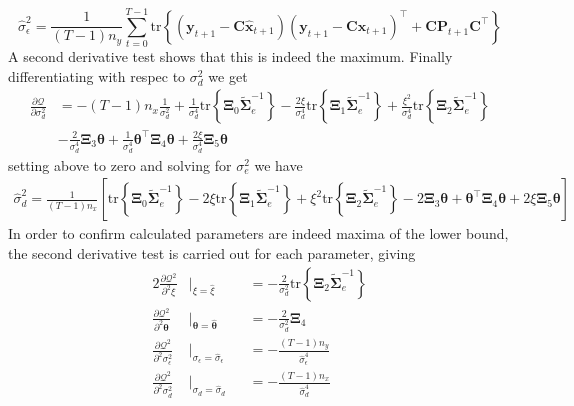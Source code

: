 \documentclass[]{article}
\begin{document}
\begin{equation}
 \hat{\sigma}_{\epsilon}^2=\frac{1}{(T-1)n_y}\sum_{t=0}^{T-1}\mathrm{tr}\left\lbrace (\mathbf y_{t+1}-\mathbf C\mathbf{\hat{x}}_{t+1}) (\mathbf y_{t+1}-\mathbf C\mathbf{\hat{x}}_{t+1})^\top+\mathbf C \mathbf P_{t+1}\mathbf C^\top \right\rbrace
\end{equation}
A second derivative test shows that this is indeed the maximum. Finally differentiating with respec to $\sigma_d^2$ we get
\begin{align}
 \frac{\partial \mathcal Q}{\partial \sigma_d^2}&= -(T-1)n_x\frac{1}{\sigma_d^2}+\frac{1}{\sigma_d^4}\mathrm{tr}\left\lbrace \boldsymbol\Xi_0 \tilde{\boldsymbol\Sigma}_e^{-1}\right\rbrace-\frac{2\xi}{\sigma_d^4} \mathrm{tr}\left\lbrace \boldsymbol\Xi_1 \tilde{\boldsymbol\Sigma}_e^{-1}\right\rbrace+\frac{\xi^2}{\sigma_d^4}\mathrm{tr} \left\lbrace\boldsymbol\Xi_2\tilde{\boldsymbol\Sigma}_e^{-1} \right\rbrace  \nonumber \\
&-\frac{2}{\sigma_d^4}\boldsymbol\Xi_3\boldsymbol\theta +\frac{1}{\sigma_d^4}\boldsymbol\theta^\top \boldsymbol\Xi_4\boldsymbol\theta+\frac{2\xi}{\sigma_d^4} \boldsymbol\Xi_5 \boldsymbol\theta 
\end{align}
setting above to zero and solving for $\sigma_e^2$ we have
\begin{align}
\hat{\sigma}_d^2=\frac{1}{(T-1)n_x}\left[ \mathrm{tr}\left\lbrace \boldsymbol\Xi_0 \tilde{\boldsymbol\Sigma}_e^{-1}\right\rbrace-
2\xi\mathrm{tr}\left\lbrace \boldsymbol\Xi_1 \tilde{\boldsymbol\Sigma}_e^{-1}\right\rbrace +\xi^2\mathrm{tr} \left\lbrace\boldsymbol\Xi_2\tilde{\boldsymbol\Sigma}_e^{-1}\right\rbrace -2\boldsymbol\Xi_3\boldsymbol\theta+\boldsymbol\theta^\top\boldsymbol \Xi_4\boldsymbol\theta+2\xi\boldsymbol\Xi_5 \boldsymbol\theta\right]  
\end{align}
In order to confirm calculated parameters are indeed maxima of the lower bound, the second derivative test is carried out for each parameter, giving
\begin{alignat}{2}%
 \frac{\partial \mathcal Q^2}{\partial^2\xi}&\biggr\rvert_{\xi=\hat{\xi}}&&=-\frac{2}{\sigma_d^2}\mathrm{tr}\left\lbrace \boldsymbol\Xi_2 \tilde{\boldsymbol\Sigma}_e^{-1}\right\rbrace \label{eq:SecondDerivativexi}\\
 \frac{\partial \mathcal Q^2}{\partial^2\boldsymbol\theta}&\biggr\rvert_{\boldsymbol\theta=\hat{\boldsymbol\theta}}&&=-\frac{2}{\sigma_d^2}\boldsymbol\Xi_4 \label{eq:SecondDerivativetheta} \\
 \frac{\partial \mathcal Q^2}{\partial^2\sigma_{\epsilon}^2}&\biggr\rvert_{\sigma_{\epsilon}=\hat{\sigma}_{\epsilon}}&&=-\frac{(T-1)n_y}{\hat{\sigma}_{\epsilon}^4} \label{eq:SecondDerivativenoise} \\
 \frac{\partial \mathcal Q^2}{\partial^2\sigma_{d}^2}&\biggr\rvert_{{\sigma}_{d}=\hat{\sigma}_{d}}&&= -\frac{(T-1)n_x}{\hat{\sigma}_{d}^4} \label{eq:SecondDerivativedisturbance}
\end{alignat}
\end{document}

